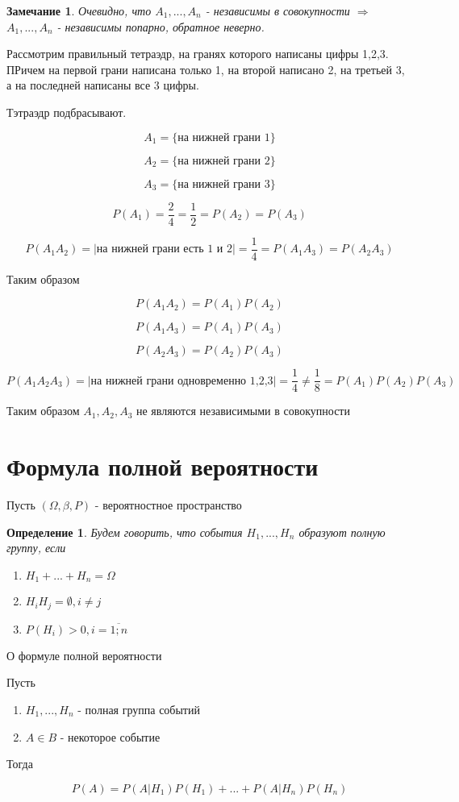 \documentclass[a4paper, 14pt]{report}
\newtheorem{defenition}{Определение}[chapter]
\newtheorem{note}{Замечание}[chapter]
\begin{document}
\begin{note}
    Очевидно, что $A_1,...,A_n$ - независимы в совокупности $\Rightarrow$ $A_1,...,A_n$ - независимы попарно, обратное неверно.
\end{note}

Рассмотрим правильный тетраэдр, на гранях которого написаны цифры 1,2,3. ПРичем на первой грани написана только 1, на второй написано 2, на третьей 3, а на последней написаны все 3 цифры.

Тэтраэдр подбрасывают.

$$
A_1 = \{ \text{на нижней грани 1} \}
$$

$$
A_2 = \{ \text{на нижней грани 2} \}
$$

$$
A_3 = \{ \text{на нижней грани 3} \}
$$

$$
P(A_1) = \frac{2}{4} = \frac{1}{2} = P(A_2) = P(A_3)
$$

$$
P(A_1A_2) = | \text{на нижней грани есть 1 и 2} | = \frac{1}{4} = P(A_1A_3) = P(A_2A_3)
$$

Таким образом

$$
P(A_1A_2) = P(A_1)P(A_2)
$$


$$
P(A_1A_3) = P(A_1)P(A_3)
$$

$$
P(A_2A_3) = P(A_2)P(A_3)
$$

$$
P(A_1A_2A_3) = |\text{на нижней грани одновременно 1,2,3}| = \frac{1}{4} \ne \frac{1}{8} = P(A_1)P(A_2)P(A_3)
$$

Таким образом $A_1,A_2,A_3$ не являются независимыми в совокупности

\section{Формула полной вероятности}

Пусть $(\Omega, \beta, P)$ - вероятностное пространство

\begin{defenition}
    Будем говорить, что события $H_1, ..., H_n$ образуют полную группу, если

    \begin{enumerate}
        \item $H_1 + ... + H_n = \Omega$
        \item $H_i H_j = \emptyset, i\ne j$
        \item $P(H_i) > 0, i = \overline{1;n}$
    \end{enumerate}
\end{defenition}

\begin{theorem}
    О формуле полной вероятности

    Пусть

    \begin{enumerate}
        \item $H_1,...,H_n$ - полная группа событий
        \item $A \in B$ - некоторое событие
    \end{enumerate}

    Тогда

    $$
    P(A) = P(A|H_1)P(H_1) + ... + P(A|H_n)P(H_n)
    $$
\end{theorem}
\end{document}
